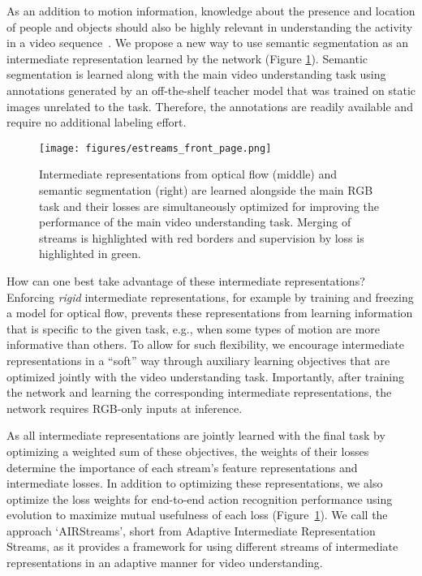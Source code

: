 \documentclass[final]{cvpr}
\begin{document}
As an addition to motion information, knowledge about the presence and location of people and objects should also be highly relevant in understanding the activity in a video sequence~\cite{jain2015what}. We propose a new way to use semantic segmentation as an intermediate representation learned by the network (Figure \ref{fig:teaser}). Semantic segmentation is learned along with the main video understanding task using annotations generated by an off-the-shelf teacher model that was trained on static images unrelated to the task. Therefore, the annotations are readily available and require no additional labeling effort.

\begin{figure}[t]
  \centering
  \texttt{[image: figures/estreams\_front\_page.png]}\caption{
Intermediate representations from optical flow (middle) and semantic segmentation (right) are learned alongside the main RGB task and their losses are simultaneously optimized for improving the performance of the main video understanding task. Merging of streams is highlighted with red borders and supervision by loss is highlighted in green.}
  \label{fig:teaser}
\end{figure}

How can one best take advantage of these intermediate representations?
Enforcing \emph{rigid} intermediate representations, for example by training and freezing a model for optical flow, prevents these representations from learning information that is specific to the given task, e.g., when some types of motion are more informative than others. To allow for such flexibility, we encourage intermediate representations in a ``soft'' way through auxiliary learning objectives that are optimized jointly with the video understanding task. Importantly, after training the network and learning the corresponding intermediate representations, the network requires RGB-only inputs at inference. 

As all intermediate representations are jointly learned with the final task by optimizing a weighted sum of these objectives, the weights of their losses determine the importance of each stream's feature representations and intermediate losses. In addition to optimizing these representations, we also optimize the loss weights for end-to-end action recognition performance using evolution to maximize mutual usefulness of each loss (Figure~\ref{fig:teaser}). We call the approach `AIRStreams', short from Adaptive Intermediate Representation Streams, as it provides a  framework for using different streams of intermediate representations in an adaptive manner for video understanding.
\end{document}
